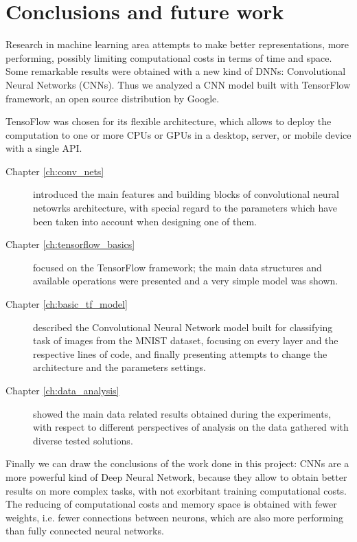 \chapter{Conclusions and future work}\label{ch:conclusions}

Research in machine learning area attempts to make better representations, more performing, possibly limiting computational costs in terms of time and space. Some remarkable results were obtained with a new kind of \acsp{DNN}: Convolutional Neural Networks (\acsp{CNN}). Thus we analyzed a \acs{CNN} model built with TensorFlow framework, an open source distribution by Google.

TensoFlow was chosen for its flexible architecture, which allows to deploy the computation to one or more \acsp{CPU} or \acsp{GPU} in a desktop, server, or mobile device with a single API.

\begin{description}
	\item[Chapter \ref{ch:conv_nets}] introduced the main features and building blocks of convolutional neural netowrks architecture, with special regard to the parameters which have been taken into account when designing one of them.
	
	\item[Chapter \ref{ch:tensorflow_basics}] focused on the TensorFlow framework; the main data structures and available operations were presented and a very simple model was shown.
	
	\item[Chapter \ref{ch:basic_tf_model}] described the Convolutional Neural Network model built for classifying task of images from the \acs{MNIST} dataset, focusing on every layer and the respective lines of code, and finally presenting attempts to change the architecture and the parameters settings.
	
	\item[Chapter \ref{ch:data_analysis}] showed the main data related results obtained during the experiments, with respect to different perspectives of analysis on the data gathered with diverse tested solutions.
\end{description}

Finally we can draw the conclusions of the work done in this project: \acsp{CNN} are a more powerful kind of Deep Neural Network, because they allow to obtain better results on more complex tasks, with not exorbitant training computational costs. The reducing of computational costs and memory space is obtained with fewer weights, i.e. fewer connections between neurons, which are also more performing than fully connected neural networks.

